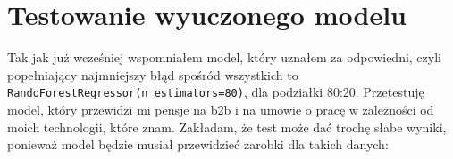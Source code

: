 \documentclass[a4paper]{article}
\begin{document}
\section{Testowanie wyuczonego modelu}

\quad Tak jak już wcześniej wspomniałem model, który uznałem za odpowiedni, czyli popełniający najmniejszy błąd
spośród wszystkich to \texttt{RandoForestRegressor(n_estimators=80)}, dla podziałki 80:20. 
Przetestuję model, który przewidzi mi pensje na b2b i na umowie o pracę w zależności od
moich technologii, które znam. Zakładam, że test może dać trochę słabe wyniki, ponieważ
model będzie musiał przewidzieć zarobki dla takich danych: 
\end{document}
